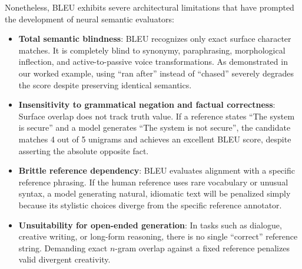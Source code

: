 \documentclass[../../main.tex]{subfiles}
\begin{document}
Nonetheless, BLEU exhibits severe architectural limitations that have prompted the development of neural semantic evaluators:
\begin{itemize}
    \item \textbf{Total semantic blindness}: BLEU recognizes only exact surface character matches. It is completely blind to synonymy, paraphrasing, morphological inflection, and active-to-passive voice transformations. As demonstrated in our worked example, using ``ran after'' instead of ``chased'' severely degrades the score despite preserving identical semantics.
    \item \textbf{Insensitivity to grammatical negation and factual correctness}: Surface overlap does not track truth value. If a reference states ``The system is secure'' and a model generates ``The system is not secure'', the candidate matches 4 out of 5 unigrams and achieves an excellent BLEU score, despite asserting the absolute opposite fact.
    \item \textbf{Brittle reference dependency}: BLEU evaluates alignment with a specific reference phrasing. If the human reference uses rare vocabulary or unusual syntax, a model generating natural, idiomatic text will be penalized simply because its stylistic choices diverge from the specific reference annotator.
    \item \textbf{Unsuitability for open-ended generation}: In tasks such as dialogue, creative writing, or long-form reasoning, there is no single ``correct'' reference string. Demanding exact $n$-gram overlap against a fixed reference penalizes valid divergent creativity.
\end{itemize}

\clearpage
\thispagestyle{empty}
\null
\clearpage
\end{document}
